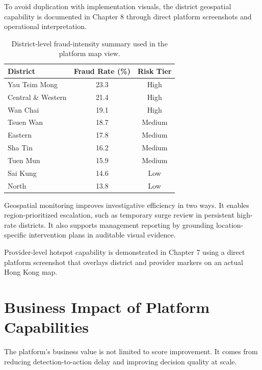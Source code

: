 \documentclass[12pt,a4paper]{report}
\begin{document}
To avoid duplication with implementation visuals, the district geospatial capability is documented in Chapter 8 through direct platform screenshots and operational interpretation.

\begin{table}[H]
\caption{District-level fraud-intensity summary used in the platform map view.}
\label{tab:hk_district_summary}
\begin{tabular}{lcc}
\toprule
\textbf{District} & \textbf{Fraud Rate (\%)} & \textbf{Risk Tier} \\
\midrule
Yau Tsim Mong & 23.3 & High \\
Central \& Western & 21.4 & High \\
Wan Chai & 19.1 & High \\
Tsuen Wan & 18.7 & Medium \\
Eastern & 17.8 & Medium \\
Sha Tin & 16.2 & Medium \\
Tuen Mun & 15.9 & Medium \\
Sai Kung & 14.6 & Low \\
North & 13.8 & Low \\
\bottomrule
\end{tabular}
\end{table}

Geospatial monitoring improves investigative efficiency in two ways. It enables region-prioritized escalation, such as temporary surge review in persistent high-rate districts. It also supports management reporting by grounding location-specific intervention plans in auditable visual evidence.

Provider-level hotspot capability is demonstrated in Chapter 7 using a direct platform screenshot that overlays district and provider markers on an actual Hong Kong map.

\section{Business Impact of Platform Capabilities}
The platform's business value is not limited to score improvement. It comes from reducing detection-to-action delay and improving decision quality at scale.
\end{document}

